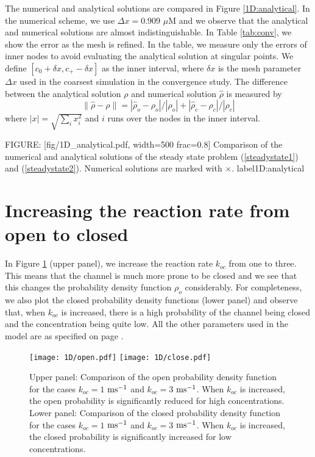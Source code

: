 The numerical and analytical solutions are compared in Figure \ref{1D:analytical}. In the numerical
scheme, we use $\Delta x = 0.909$ $\mu$M and we observe that the analytical and numerical solutions are almost indistinguishable. In Table \ref{tab:conv}, 
we show the error as the mesh is refined. In the table, we measure only the errors of inner nodes to avoid evaluating 
the analytical solution at singular points. We define $[c_0+\delta x,c_+-\delta x]$ as the inner interval, where $\delta x$ is the mesh parameter $\Delta x$ used in the coarsest simulation in the convergence study.  The difference between
the analytical solution $\rho$ and 
numerical solution $\hat{\rho}$ is measured by
\begin{equation}
 \| \hat{\rho}-\rho\|= |\hat{\rho}_o-\rho_o|/|\rho_o|+ |\hat{\rho}_c-\rho_c|/|\rho_c| \label{norm}
\end{equation}
where $|x| = \sqrt{\sum_{i} x_i^2}$ and $i$ runs over the nodes in the inner interval.

FIGURE: [fig/1D_analytical.pdf, width=500 frac=0.8] Comparison of the numerical and analytical solutions of the steady state 
problem (\ref{steadystate1}) and (\ref{steadystate2}). Numerical solutions are marked with $\times$. label{1D:analytical}


\section{Increasing the reaction rate from open to closed}
\label{increasingkoc}

In Figure \ref{1D/openclose} (upper panel), we increase the reaction rate $k_{oc}$ from one to three. This means that the channel is much more prone to be closed and we see that this changes the probability density function $\rho_o$ considerably. For completeness, we also plot the closed probability density functions (lower panel) and observe that, when $k_{oc}$ is increased, there is a high probability of the channel being closed and the concentration being quite low. All the other parameters used in the model are as specified on page \pageref{tab:1Dsode}.

\begin{figure}[p]\centering
\vbox{
\texttt{[image: 1D/open.pdf]}
\texttt{[image: 1D/close.pdf]}
}
\caption{Upper panel: Comparison of the open probability density function for the cases $k_{oc}=1$ $\rm{ms^{-1}}$ and $k_{oc}=3$ $\rm{ms^{-1}}$.
 When  $k_{oc}$ is increased, the open probability is significantly reduced for high concentrations.
 Lower panel:   Comparison of the closed probability density function for the cases $k_{oc}=1$ $\rm{ms^{-1}}$ and $k_{oc}=3$ $\rm{ms^{-1}}$.
 When  $k_{oc}$ is increased, the closed probability is significantly increased for low concentrations.
    \label{1D/openclose}}
\end{figure}


